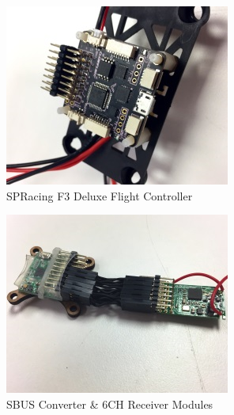 \par
\begin{figure}[htbp]
\begin{subfigure}{0.5\textwidth}
\centering
\includegraphics[width=\textwidth]{figs/f3-deluxe}
\caption{SPRacing F3 Deluxe Flight Controller}
\end{subfigure}
\begin{subfigure}{0.5\textwidth}
\centering
\includegraphics[width=\textwidth]{figs/ppm-sbus}
\caption{SBUS Converter \& 6CH Receiver Modules}
\end{subfigure}
\caption{}
\end{figure}
